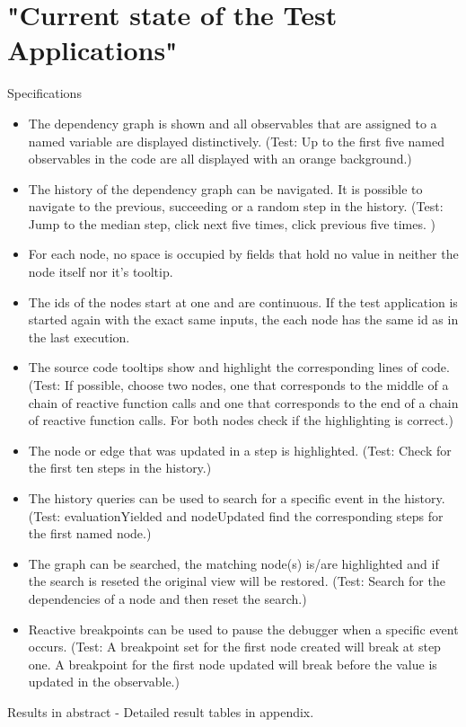 \section{"Current state of the Test Applications"}
	Specifications
	\begin{itemize}
		\item The dependency graph is shown and all observables that are assigned to a named variable are displayed distinctively.
		(Test: Up to the first five named observables in the code are all displayed with an orange background.)
		\item The history of the dependency graph can be navigated. It is possible to navigate to the previous, succeeding or a random step in the history. (Test: Jump to the median step, click next five times, click previous five times. )
		\item For each node, no space is occupied by fields that hold no value in neither the node itself nor it's tooltip.
		\item The ids of the nodes start at one and are continuous. If the test application is started again with the exact same inputs, the each node has the same id as in the last execution.
		\item The source code tooltips show and highlight the corresponding lines of code. (Test: If possible, choose two nodes, one that corresponds to the middle of a chain of reactive function calls and one that corresponds to the end of a chain of reactive function calls. For both nodes check if the highlighting is correct.)
		\item The node or edge that was updated in a step is highlighted. (Test: Check for the first ten steps in the history.)
		\item The history queries can be used to search for a specific event in the history. (Test: evaluationYielded and nodeUpdated find the corresponding steps for the first named node.)
		\item The graph can be searched, the matching node(s) is/are highlighted and if the search is reseted the original view will be restored. (Test: Search for the dependencies of a node and then reset the search.)
		\item Reactive breakpoints can be used to pause the debugger when a specific event occurs. (Test: A breakpoint set for the first node created will break at step one. A breakpoint for the first node updated will break before the value is updated in the observable.)
	\end{itemize}
	Results in abstract - Detailed result tables in appendix.
